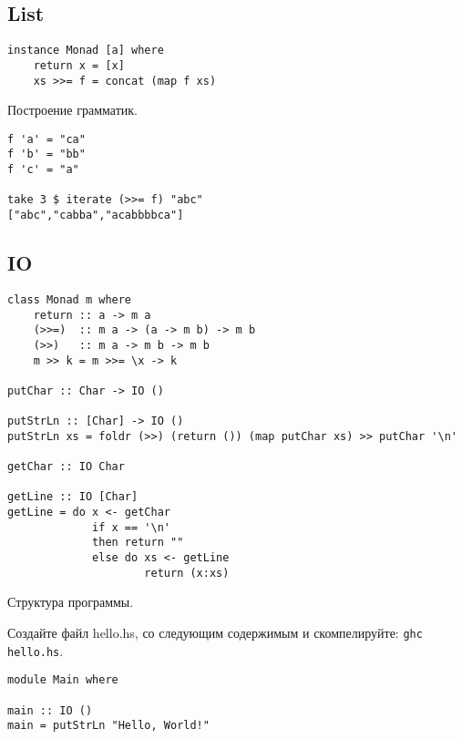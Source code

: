 \documentclass[a4paper,10pt]{article}
\begin{document}
\subsection{List}
\begin{lstlisting}
instance Monad [a] where
    return x = [x]
    xs >>= f = concat (map f xs)
\end{lstlisting}

Построение грамматик.
\begin{lstlisting}
f 'a' = "ca"
f 'b' = "bb"
f 'c' = "a"

take 3 $ iterate (>>= f) "abc"
["abc","cabba","acabbbbca"]
\end{lstlisting}

\subsection{IO}
\begin{lstlisting}
class Monad m where
    return :: a -> m a
    (>>=)  :: m a -> (a -> m b) -> m b
    (>>)   :: m a -> m b -> m b
    m >> k = m >>= \x -> k

putChar :: Char -> IO ()

putStrLn :: [Char] -> IO ()
putStrLn xs = foldr (>>) (return ()) (map putChar xs) >> putChar '\n'

getChar :: IO Char

getLine :: IO [Char]
getLine = do x <- getChar
             if x == '\n'
             then return ""
             else do xs <- getLine
                     return (x:xs)
\end{lstlisting}

Структура программы.

Создайте файл hello.hs, со следующим содержимым и скомпелируйте: {\tt ghc hello.hs}.
\begin{lstlisting}
module Main where

main :: IO ()
main = putStrLn "Hello, World!"
\end{lstlisting}
\end{document}
